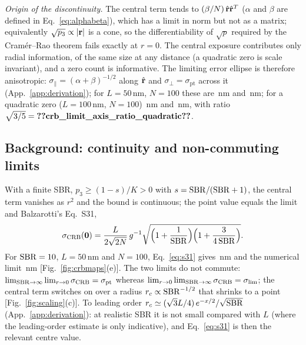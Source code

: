 \emph{Origin of the discontinuity.} The central term tends to $(\beta/N)\,\hat{\mathbf{r}}\hat{\mathbf{r}}^{T}$
($\alpha$ and $\beta$ are defined in Eq.~\eqref{eq:alphabeta}), which has a limit in norm but not as a matrix; equivalently $\sqrt{p_3}\propto|\mathbf{r}|$ is a cone, so the
differentiability of $\sqrt{p}$ required by the Cram\'er--Rao theorem fails exactly at $r=0$. The central exposure contributes only radial information, of the same
size at any distance (a quadratic zero is scale invariant), and a zero count is informative.
The limiting error ellipse is therefore anisotropic: $\sigma_\parallel=(\alpha+\beta)^{-1/2}$
along $\hat{\mathbf{r}}$ and $\sigma_\perp=\sigma_{\mathrm{pt}}$ across it (App.~\ref{app:derivation}); for
$L=50$\,nm, $N=100$ these are
\,nm and
\,nm; for a quadratic
zero ($L=100$\,nm, $N=100$) \,nm
and \,nm,
with ratio $\sqrt{3/5}=\pnum{crb_limit_axis_ratio_quadratic}\src{crb_limit_axis_ratio_quadratic}$.

\subsection{Background: continuity and non-commuting limits}
With a finite SBR, $p_3\ge(1-s)/K>0$ with $s=\mathrm{SBR}/(\mathrm{SBR}+1)$, the central term vanishes as $r^2$
and the bound is continuous; the point value equals the limit and Balzarotti's Eq.~S31,
\begin{equation}
\sigma_{\mathrm{CRB}}(\mathbf0)=\frac{L}{2\sqrt{2N}}\,g^{-1}\sqrt{\Big(1+\frac{1}{\mathrm{SBR}}\Big)\Big(1+\frac{3}{4\,\mathrm{SBR}}\Big)}.
\label{eq:s31}
\end{equation}
For $\mathrm{SBR}=10$, $L=50$\,nm and $N=100$, Eq.~\eqref{eq:s31} gives
\,nm and the numerical
limit \,nm
[Fig.~\ref{fig:crbmaps}(e)]. The two limits do not commute:
$\lim_{\mathrm{SBR}\to\infty}\lim_{r\to0}\sigma_{\mathrm{CRB}}=\sigma_{\mathrm{pt}}$ whereas
$\lim_{r\to0}\lim_{\mathrm{SBR}\to\infty}\sigma_{\mathrm{CRB}}=\sigma_{\lim}$; the central term switches on over a radius
$r_c\propto\mathrm{SBR}^{-1/2}$ that shrinks to a point [Fig.~\ref{fig:scaling}(c)]. To leading order
$r_c\simeq(\sqrt3L/4)\,e^{-x/2}/\sqrt{\mathrm{SBR}}$ (App.~\ref{app:derivation}): at realistic SBR it is
not small compared with $L$ (where the leading-order estimate is only indicative), and
Eq.~\eqref{eq:s31} is then the relevant centre value.

